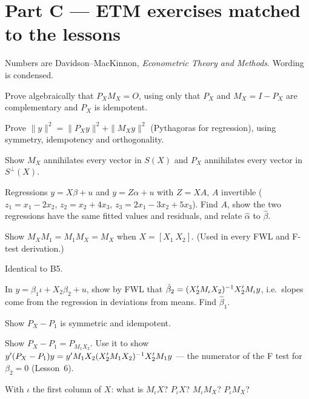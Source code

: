 \documentclass[11pt]{article}
\begin{document}
\section{Part C --- ETM exercises matched to the lessons}

Numbers are Davidson--MacKinnon, \emph{Econometric Theory and Methods}. Wording
is condensed.


 Prove algebraically that $P_{X}M_{X} = O$, using only that
$P_{X}$ and $M_{X} = I - P_{X}$ are complementary and $P_{X}$ is idempotent.

 Prove $\|y\|^{2} = \|P_{X}y\|^{2} + \|M_{X}y\|^{2}$
(Pythagoras for regression), using symmetry, idempotency and orthogonality.

 Show $M_{X}$ annihilates every vector in $S(X)$ and $P_{X}$
annihilates every vector in $S^{\perp}(X)$.

 Regressions $y = X\beta + u$ and $y = Z\alpha + u$ with
$Z = XA$, $A$ invertible ($z_{1} = x_{1} - 2x_{2}$, $z_{2} = x_{2} + 4x_{3}$,
$z_{3} = 2x_{1} - 3x_{2} + 5x_{3}$). Find $A$, show the two regressions have the
same fitted values and residuals, and relate $\hat\alpha$ to $\hat\beta$.

 Show $M_{X}M_{1} = M_{1}M_{X} = M_{X}$ when $X = [X_{1}\ X_{2}]$.
(Used in every FWL and F-test derivation.)

 
Identical to B5.

 In $y = \beta_{1}\iota + X_{2}\beta_{2} + u$, show by FWL that
$\hat\beta_{2} = (X_{2}^{\prime} M_{\iota}X_{2})^{-1}X_{2}^{\prime} M_{\iota}y$, i.e.\ slopes
come from the regression in deviations from means. Find $\hat\beta_{1}$.

 Show $P_{X} - P_{1}$ is symmetric and idempotent.

 Show $P_{X} - P_{1} = P_{M_{1}X_{2}}$. Use it to show
$y^{\prime}(P_{X} - P_{1})y = y^{\prime} M_{1}X_{2}(X_{2}^{\prime} M_{1}X_{2})^{-1}X_{2}^{\prime} M_{1}y$
--- the numerator of the F test for $\beta_{2} = 0$ (Lesson~6).

 With $\iota$ the first column of $X$: what is $M_{\iota}X$?
$P_{\iota}X$? $M_{\iota}M_{X}$? $P_{\iota}M_{X}$?
\end{document}
